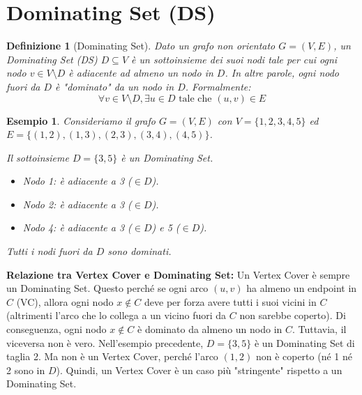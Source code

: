 \documentclass[a4paper]{article}
\newtheorem{definition}{Definizione}[section]
\newtheorem{example}{Esempio}[section]
\theoremstyle{definition} %
\begin{document}
\section{Dominating Set (DS)}

\begin{definition}[Dominating Set]
Dato un grafo non orientato $G=(V, E)$, un \emph{Dominating Set} (DS) $D \subseteq V$ è un sottoinsieme dei suoi nodi tale per cui ogni nodo $v \in V \setminus D$ è adiacente ad almeno un nodo in $D$. In altre parole, ogni nodo fuori da $D$ è "dominato" da un nodo in $D$. Formalmente:
\[ \forall v \in V \setminus D, \exists u \in D \text{ tale che } (u, v) \in E \]
\end{definition}

\begin{example}
Consideriamo il grafo $G=(V, E)$ con $V=\{1,2,3,4,5\}$ ed $E=\{(1,2), (1,3), (2,3), (3,4), (4,5)\}$.
\begin{center}
\end{center}
Il sottoinsieme $D=\{3,5\}$ è un Dominating Set.
\begin{itemize}
    \item Nodo 1: è adiacente a 3 ($\in D$).
    \item Nodo 2: è adiacente a 3 ($\in D$).
    \item Nodo 4: è adiacente a 3 ($\in D$) e 5 ($\in D$).
\end{itemize}
Tutti i nodi fuori da $D$ sono dominati.
\end{example}

\textbf{Relazione tra Vertex Cover e Dominating Set:}
Un Vertex Cover è sempre un Dominating Set. Questo perché se ogni arco $(u,v)$ ha almeno un endpoint in $C$ (VC), allora ogni nodo $x \notin C$ deve per forza avere tutti i suoi vicini in $C$ (altrimenti l'arco che lo collega a un vicino fuori da $C$ non sarebbe coperto). Di conseguenza, ogni nodo $x \notin C$ è dominato da almeno un nodo in $C$.
Tuttavia, il viceversa non è vero. Nell'esempio precedente, $D=\{3,5\}$ è un Dominating Set di taglia 2. Ma non è un Vertex Cover, perché l'arco $(1,2)$ non è coperto (né 1 né 2 sono in $D$).
Quindi, un Vertex Cover è un caso più "stringente" rispetto a un Dominating Set.
\end{document}
